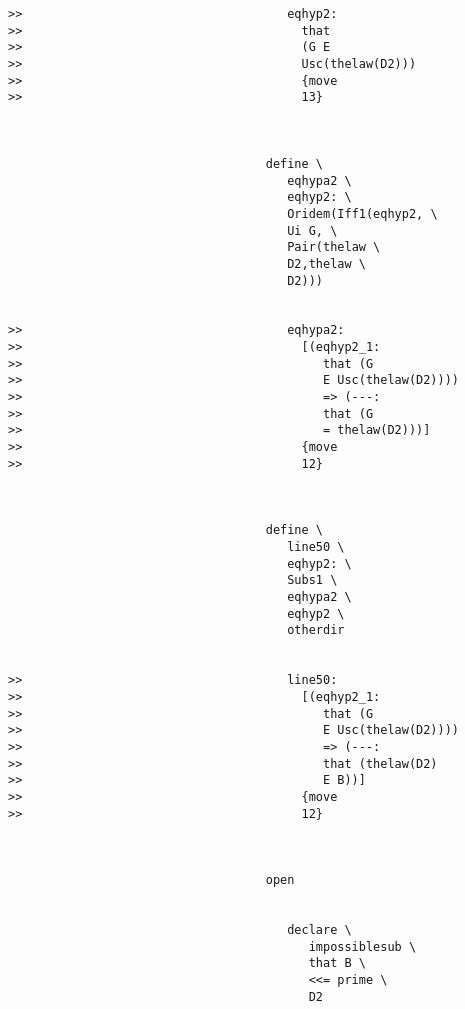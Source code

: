 \documentclass[12pt]{article}
\begin{document}
\begin{verbatim}
>>                                     eqhyp2:
>>                                       that
>>                                       (G E
>>                                       Usc(thelaw(D2)))
>>                                       {move
>>                                       13}



                                    define \
                                       eqhypa2 \
                                       eqhyp2: \
                                       Oridem(Iff1(eqhyp2, \
                                       Ui G, \
                                       Pair(thelaw \
                                       D2,thelaw \
                                       D2)))


>>                                     eqhypa2:
>>                                       [(eqhyp2_1:
>>                                          that (G
>>                                          E Usc(thelaw(D2))))
>>                                          => (---:
>>                                          that (G
>>                                          = thelaw(D2)))]
>>                                       {move
>>                                       12}



                                    define \
                                       line50 \
                                       eqhyp2: \
                                       Subs1 \
                                       eqhypa2 \
                                       eqhyp2 \
                                       otherdir


>>                                     line50:
>>                                       [(eqhyp2_1:
>>                                          that (G
>>                                          E Usc(thelaw(D2))))
>>                                          => (---:
>>                                          that (thelaw(D2)
>>                                          E B))]
>>                                       {move
>>                                       12}



                                    open


                                       declare \
                                          impossiblesub \
                                          that B \
                                          <<= prime \
                                          D2


\end{verbatim}
\end{document}
